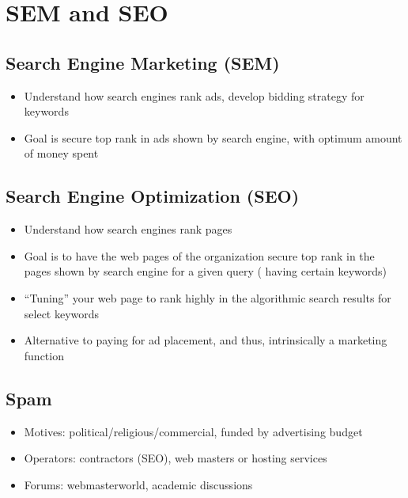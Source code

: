 \documentclass{article}
\begin{document}
\section{SEM and SEO}
\subsection{Search Engine Marketing (SEM)}
\begin{itemize}
    \item Understand how search engines rank ads, develop bidding strategy for keywords
    
    \item Goal is secure top rank in ads shown by search engine, with optimum amount of money spent
\end{itemize}

\subsection{Search Engine Optimization (SEO)}
\begin{itemize}
    \item Understand how search engines rank pages
    
    \item Goal is to have the web pages of the organization secure top rank in the pages shown by search engine for a given query ( having certain keywords)
    
    \item “Tuning” your web page to rank highly in the algorithmic search results for select keywords
    
    \item Alternative to paying for ad placement, and thus, intrinsically a marketing function
\end{itemize}

\subsection{Spam}
\begin{itemize}
    \item Motives: political/religious/commercial, funded by advertising budget
    
    \item Operators: contractors (SEO), web masters or hosting services
    
    \item Forums: webmasterworld, academic discussions
\end{itemize}
\end{document}
